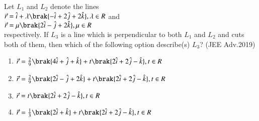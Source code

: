	\item Let $L_1$ and $L_2$ denote the lines\\ $\vec{r}=\hat{i}+\lambda\brak{-\hat{i}+2\hat{j}+2\hat{k}}, \lambda \in R$ and \\
		$\vec{r}=\mu \brak{2\hat{i}-\hat{j}+2\hat{k}}, \mu \in R$\\ respectively. If $L_3$ is a line which is perpendicular to both $L_1$ and $L_2$ and cuts both of them, then which of 
		the following option describe(s) $L_3$? \hfill{(JEE Adv.2019)}
		\begin{enumerate}
			\item $\vec{r}=\frac{2}{9}\brak{4\hat{i}+\hat{j}+\hat{k}}+t\brak{2\hat{i}+2\hat{j}-\hat{k}},t \in R$
			\item $\vec{r}=\frac{2}{9}\brak{2\hat{i}-\hat{j}+2\hat{k}}+t\brak{2\hat{i}+2\hat{j}-\hat{k}}, t \in R$
			\item $\vec{r}=t\brak{2\hat{i}+2\hat{j}-\hat{k}},t \in R$
			\item $\vec{r}=\frac{1}{3}\brak{2\hat{i}+\hat{k}}+t\brak{2\hat{i}+2\hat{j}-\hat{k}},t \in R$
		\end{enumerate}
